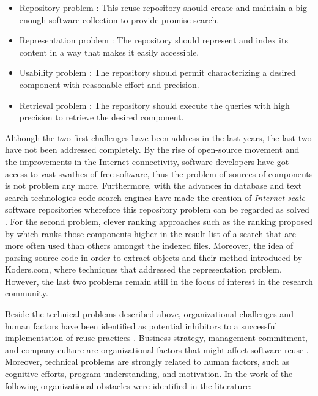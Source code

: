 \begin{itemize}
\item Repository problem \citep{Seacord1999}: This reuse repository should create and maintain a big enough software collection to provide promise search.
\item Representation problem \citep{Pole1994}: The repository should represent and index its content in a way that makes it easily accessible.
\item Usability problem \citep{Garcia2006}: The repository should permit characterizing a desired component with reasonable effort and precision.
\item Retrieval problem \citep{Prieto-Diaz1987}: The repository should execute the queries with high precision to retrieve the desired component.
\end{itemize}

Although the two first challenges have been address in the last years, the last two have not been addressed completely. By the rise of open-source movement and the improvements in the Internet connectivity, software developers have got access to vast swathes of free software, thus the problem of sources of components is not problem any more. Furthermore, with the advances in database and text search technologies code-search engines have made the creation of \textit{Internet-scale} software repositories wherefore this repository problem can be regarded as solved \citep{Hummel2013}. For the second problem, clever ranking approaches such as the ranking proposed by \cite{Inoue2005} which ranks those components higher in the result list of a search that are more often used than others amongst the indexed files. Moreover, the idea of parsing source code in order to extract objects and their method introduced by Koders.com, where techniques that addressed the representation problem. However, the last two problems remain still in the focus of interest in the research community.

Beside the technical problems described above, organizational challenges and human factors have been identified as potential inhibitors to a successful implementation of reuse practices \citep{Morisio2002}. Business strategy, management commitment, and company culture are organizational factors that might affect software reuse \citep{Standish1984}. Moreover, technical problems are strongly related to human factors, such as cognitive efforts, program understanding, and motivation. In the work of \cite{Bauer2016} the following organizational obstacles were identified in the literature:

